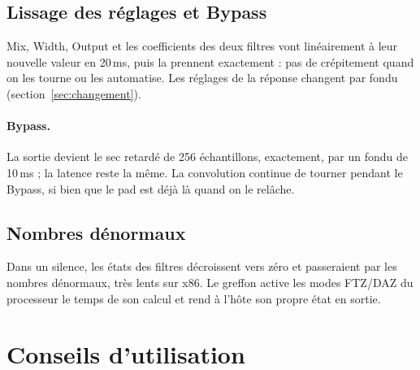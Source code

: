 \documentclass[a4paper,11pt]{article}
\begin{document}
\subsection{Lissage des réglages et Bypass}\label{sec:lissage}

Mix, Width, Output et les coefficients des deux filtres vont linéairement à leur nouvelle valeur
en 20\,ms, puis la prennent exactement : pas de crépitement quand on les tourne ou les automatise.
Les réglages de la réponse changent par fondu (section~\ref{sec:changement}).

\paragraph{Bypass.} La sortie devient le sec retardé de 256 échantillons, exactement, par un fondu
de 10\,ms ; la latence reste la même. La convolution continue de tourner pendant le Bypass, si
bien que le pad est déjà là quand on le relâche.

\subsection{Nombres dénormaux}

Dans un silence, les états des filtres décroissent vers zéro et passeraient par les nombres
dénormaux, très lents sur x86. Le greffon active les modes FTZ/DAZ du processeur le temps de son
calcul et rend à l'hôte son propre état en sortie.

\section{Conseils d'utilisation}
\end{document}
